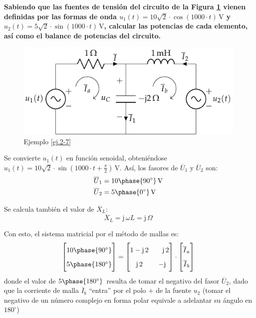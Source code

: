 \vspace{4mm}
\begin{example}\label{ej.2-7}
  \textbf{Sabiendo que las fuentes de tensión del circuito de la
    Figura \ref{fig.problema9_garri} vienen definidas por las formas
    de onda $u_1(t)=10\sqrt{2}\cdot \cos(1000\cdot t) \,\si{\volt}$ y
    $u_2(t)=5\sqrt{2}\cdot \sin(1000\cdot t) \,\si{\volt}$, calcular
    las potencias de cada elemento, así como el balance de potencias
    del circuito. }
  \begin{figure}[H]
    \centering
    \includegraphics[width=0.6\linewidth]{../figs/ej7_BT2.pdf}
    \caption{Ejemplo \ref{ej.2-7}}
    \label{fig.problema9_garri}
  \end{figure}
		
  Se convierte $u_1(t)$ en función senoidal, obteniéndose
  $u_1(t)=10\sqrt{2}\cdot \sin(1000\cdot t+\frac{\pi}{2})
  \,\si{\volt}$. Así, los fasores de $\overline{U}_1$ y
  $\overline{U}_2$ son:
  \begin{align*}
    \overline{U}_1&=10\phase{90^\circ}\,\si{\volt}\\
    \overline{U}_2&=5\phase{0^\circ}\,\si{\volt}
  \end{align*}
		
  Se calcula también el valor de $\overline{X}_L$:
  \begin{equation*}
    \overline{X}_L=\mathrm{j}\,\omega L=\mathrm{j}\,\Omega
  \end{equation*}
		
  Con esto, el sistema matricial por el método de mallas es:
  \begin{equation*}
    \begin{bmatrix}
      \vphantom{\dfrac{1}{1}}10\phase{90^\circ} \\[4pt]
      \vphantom{\dfrac{1}{1}}5\phase{180^\circ} 
    \end{bmatrix}
    =
    \begin{bmatrix}
      \vphantom{\dfrac{1}{1}}1-\mathrm{j}\,2 & \quad\mathrm{j}\,2 \\[4pt]
      \vphantom{\dfrac{1}{1}}\mathrm{j}\,2 & -\mathrm{j} \\
    \end{bmatrix}
    \cdot 
    \begin{bmatrix}
      \vphantom{\dfrac{1}{1}}\overline{I}_a\\[4pt]
      \vphantom{\dfrac{1}{1}}\overline{I}_b
    \end{bmatrix}
  \end{equation*}          
  donde el valor de $5\phase{\ang{180}}$ resulta de tomar el negativo
  del fasor $\overline{U}_2$, dado que la corriente de malla
  $\overline{I}_b$ ``entra'' por el polo $+$ de la fuente $u_2$ (tomar
  el negativo de un número complejo en forma polar equivale a
  adelantar su ángulo en $180^\circ$)


\end{example}
